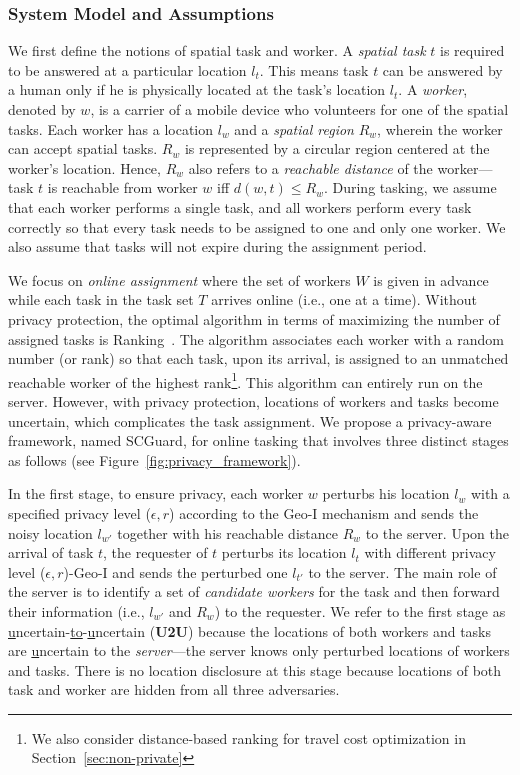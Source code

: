 \documentclass{USC-Thesis}
\newcommand{\SCG}{{SCGuard}}
\numberwithin{equation}{chapter}
\begin{document}
\subsubsection{System Model and Assumptions}
\label{sec:system2} 
We first define the notions of spatial task and worker. A \emph{spatial task} $t$ is required to be answered at a particular location $l_t$. This means task $t$ can be answered by a human only if he is physically located at the task's location $l_t$.
A \emph{worker}, denoted by $w$, is a carrier of a mobile device who volunteers for one of the spatial tasks.
Each worker has a location $l_w$ and a \emph{spatial region} $R_w$, wherein the worker can accept spatial tasks. $R_w$ is represented by a circular region centered at the worker's location. Hence, $R_w$ also refers to a \emph{reachable distance} of the worker---task $t$ is reachable from worker $w$ iff $\mathit{d(w,t)\le R_w}$. During tasking, we assume that each worker performs a single task, and all workers perform every task correctly so that every task needs to be assigned to one and only one worker. We also assume that tasks will not expire during the assignment period.

We focus on \emph{online assignment} where the set of workers $W$ is given in advance while each task in the task set $T$ arrives online (i.e., one at a time). Without privacy protection, the optimal algorithm in terms of maximizing the number of assigned tasks is Ranking~\cite{karp1990optimal}. The algorithm associates each worker with a random number (or rank) so that each task, upon its arrival, is assigned to an unmatched reachable worker of the highest rank\footnote{We also consider distance-based ranking for travel cost optimization in Section~\ref{sec:non-private}}. This algorithm can entirely run on the server. However, with privacy protection, locations of workers and tasks become uncertain, which complicates the task assignment. We propose a privacy-aware framework, named \SCG, for online tasking that involves three distinct stages as follows (see Figure~\ref{fig:privacy_framework}).

In the first stage, to ensure privacy, each worker $w$ perturbs his location $l_w$ with a specified privacy level ($\epsilon,r$) according to the Geo-I mechanism and sends the noisy location $l_{w'}$ together with his reachable distance $R_w$ to the server. Upon the arrival of task $t$, the requester of $t$ perturbs its location $l_t$ with different privacy level ($\epsilon,r$)-Geo-I and sends the perturbed one $l_{t'}$ to the server. The main role of the server is to identify a set of \emph{candidate workers} for the task and then forward their information (i.e., $l_{w'}$ and $R_w$) to the requester. We refer to the first stage as \underline{u}ncertain-\underline{to}-\underline{u}ncertain (\textbf{U2U}) because the locations of both workers and tasks are \underline{u}ncertain to the \emph{server}---the server knows only perturbed locations of workers and tasks. There is no location disclosure at this stage because locations of both task and worker are hidden from all three adversaries. 
\end{document}
